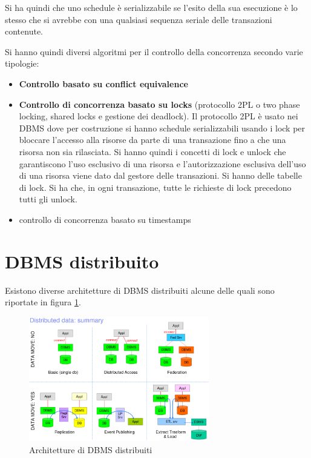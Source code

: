 Si ha quindi che uno schedule è serializzabile se l'esito della sua esecuzione è
lo stesso che si avrebbe con una qualsiasi sequenza seriale delle transazioni
contenute.

Si hanno quindi diversi algoritmi per il controllo della concorrenza secondo
varie tipologie:
\begin{itemize}
      \item \textbf{Controllo basato su conflict equivalence}
      \item \textbf{Controllo di concorrenza basato su locks} (protocollo 2PL o two
            phase locking, shared locks e gestione dei deadlock). Il protocollo
            2PL è usato nei DBMS dove per costruzione si hanno schedule
            serializzabili usando i lock per bloccare l'accesso alla risorse da
            parte di una transazione fino a che una risorsa non sia rilasciata.
            Si hanno quindi i concetti di lock e unlock che garantiscono l'uso
            esclusivo di una risorsa e l'autorizzazione esclusiva dell'uso di una
            risorsa viene dato dal gestore delle transazioni. Si hanno delle
            tabelle di lock. Si ha che, in ogni transazione, tutte le richieste
            di lock precedono tutti gli unlock.
      \item controllo di concorrenza basato su timestamps
\end{itemize}

\section{DBMS distribuito}
Esistono diverse architetture di DBMS distribuiti alcune delle quali sono
riportate in figura \ref{fig:DBMS_distributed_architecture}.
\begin{figure}
      \centering
      \includegraphics[width=0.7\textwidth]{./img/DBMS/DBMS_distributed_architecture.png}
      \caption{Architetture di DBMS distribuiti}
      \label{fig:DBMS_distributed_architecture}
\end{figure}
